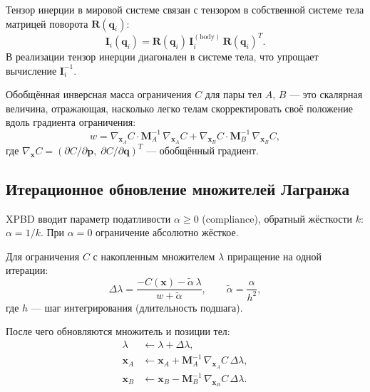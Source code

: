 Тензор инерции в мировой системе связан с тензором в собственной системе тела матрицей поворота $\mathbf{R}(\mathbf{q}_i)$:
\begin{equation}
  \mathbf{I}_i(\mathbf{q}_i) = \mathbf{R}(\mathbf{q}_i)\,\mathbf{I}_i^{(\text{body})}\,\mathbf{R}(\mathbf{q}_i)^T.
\end{equation}
В реализации тензор инерции диагонален в системе тела, что упрощает вычисление $\mathbf{I}_i^{-1}$.

Обобщённая инверсная масса ограничения $C$ для пары тел $A$, $B$ --- это скалярная
величина, отражающая, насколько легко телам скорректировать своё положение
вдоль градиента ограничения:
\begin{equation}
  w = \nabla_{\mathbf{x}_A} C \cdot \mathbf{M}_A^{-1}\,\nabla_{\mathbf{x}_A} C +
      \nabla_{\mathbf{x}_B} C \cdot \mathbf{M}_B^{-1}\,\nabla_{\mathbf{x}_B} C,
  \label{eq:gen-inv-mass}
\end{equation}
где $\nabla_{\mathbf{x}} C = (\partial C/\partial \mathbf{p},\; \partial C/\partial \mathbf{q})^T$ ---
обобщённый градиент.

\subsection{Итерационное обновление множителей Лагранжа}

XPBD вводит параметр податливости $\alpha \geq 0$ (compliance), обратный жёсткости $k$:
$\alpha = 1/k$.
При $\alpha = 0$ ограничение абсолютно жёсткое.

Для ограничения $C$ с накопленным множителем $\lambda$ приращение на одной итерации:
\begin{equation}
  \Delta\lambda = \frac{-C(\mathbf{x}) - \tilde{\alpha}\,\lambda}{w + \tilde{\alpha}},
  \qquad
  \tilde{\alpha} = \frac{\alpha}{h^2},
  \label{eq:xpbd-delta-lambda}
\end{equation}
где $h$ --- шаг интегрирования (длительность подшага).

После чего обновляются множитель и позиции тел:
\begin{align}
  \lambda &\leftarrow \lambda + \Delta\lambda, \label{eq:xpbd-lambda} \\
  \mathbf{x}_A &\leftarrow \mathbf{x}_A + \mathbf{M}_A^{-1}\,\nabla_{\mathbf{x}_A} C\,\Delta\lambda, \label{eq:xpbd-xa} \\
  \mathbf{x}_B &\leftarrow \mathbf{x}_B - \mathbf{M}_B^{-1}\,\nabla_{\mathbf{x}_B} C\,\Delta\lambda. \label{eq:xpbd-xb}
\end{align}

